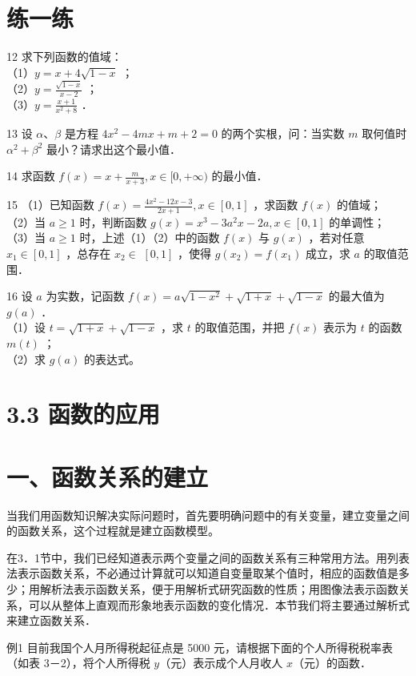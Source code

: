 \documentclass[10pt]{article}
\begin{document}
\section*{练一练}
12 求下列函数的值域：\\
（1）\(y=x+4 \sqrt{1-x}\) ；\\
（2）\(y=\frac{\sqrt{1-x}}{x-2}\) ；\\
（3）\(y=\frac{x+1}{x^{2}+8}\) ．

13 设 \(\alpha 、 \beta\) 是方程 \(4 x^{2}-4 m x+m+2=0\) 的两个实根，问：当实数 \(m\) 取何值时 \(\alpha^{2}+\beta^{2}\) 最小？请求出这个最小值．

14 求函数 \(f(x)=x+\frac{m}{x+3}, x \in[0,+\infty)\) 的最小值．

15 （1）已知函数 \(f(x)=\frac{4 x^{2}-12 x-3}{2 x+1}, x \in[0,1]\) ，求函数 \(f(x)\) 的值域；\\
（2）当 \(a \geqslant 1\) 时，判断函数 \(g(x)=x^{3}-3 a^{2} x-2 a, x \in[0,1]\) 的单调性；\\
（3）当 \(a \geqslant 1\) 时，上述（1）（2）中的函数 \(f(x)\) 与 \(g(x)\) ，若对任意 \(x_{1} \in[0,1]\) ，总存在 \(x_{2} \in\) \([0,1]\) ，使得 \(g\left(x_{2}\right)=f\left(x_{1}\right)\) 成立，求 \(a\) 的取值范围．

16 设 \(a\) 为实数，记函数 \(f(x)=a \sqrt{1-x^{2}}+\sqrt{1+x}+\sqrt{1-x}\) 的最大值为 \(g(a)\) ．\\
（1）设 \(t=\sqrt{1+x}+\sqrt{1-x}\) ，求 \(t\) 的取值范围，并把 \(f(x)\) 表示为 \(t\) 的函数 \(m(t)\) ；\\
（2）求 \(g(a)\) 的表达式。

\section*{3.3 函数的应用}
\section*{一、函数关系的建立}
当我们用函数知识解决实际问题时，首先要明确问题中的有关变量，建立变量之间的函数关系，这个过程就是建立函数模型。

在3．1节中，我们已经知道表示两个变量之间的函数关系有三种常用方法。用列表法表示函数关系，不必通过计算就可以知道自变量取某个值时，相应的函数值是多少；用解析法表示函数关系，便于用解析式研究函数的性质；用图像法表示函数关系，可以从整体上直观而形象地表示函数的变化情况．本节我们将主要通过解析式来建立函数关系．

例1 目前我国个人月所得税起征点是 5000 元，请根据下面的个人所得税税率表（如表 3－2），将个人所得税 \(y\)（元）表示成个人月收人 \(x\)（元）的函数．
\end{document}
